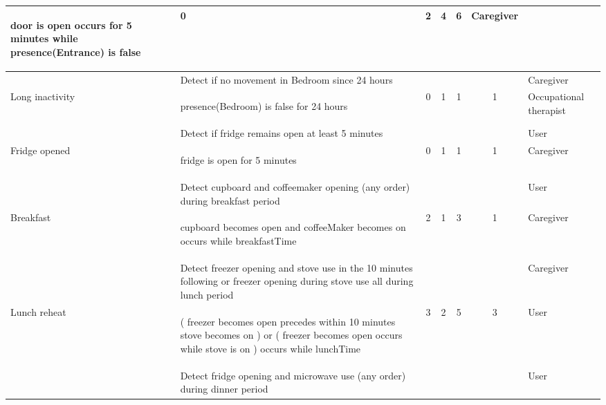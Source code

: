 \begin{table*}[!h]
\begin{tabular}{|p{1.45cm}|p{8cm}|c|c|c|c|p{1.65cm}|}
\begin{mtext}
                                    door is open occurs for 5 minutes while presence(Entrance) is false
                                  \end{mtext} & 0 & 2 & 4 & 6 &  Caregiver \\
    \hline
     &\cellcolor{gray!15} Detect if no movement in Bedroom since 24 hours & & & & & Caregiver \\ %
    Long inactivity & \begin{mtext}
      presence(Bedroom) is false for 24 hours
    \end{mtext} & 0 & 1 & 1 & 1&Occupational therapist\\                              
    \hline
    &\cellcolor{gray!15} Detect if fridge remains open at least 5 minutes & & & & & User\\%
    Fridge opened & \begin{mtext} 
      fridge is open for 5 minutes
    \end{mtext}& 0 & 1 & 1 & 1 & Caregiver \\
    \hline
     &\cellcolor{gray!15} Detect cupboard and coffeemaker opening (any order) during breakfast period &&&&& User\\%
                                 Breakfast &  \begin{mtext} 
                                    {cupboard becomes open and coffeeMaker becomes on} occurs while breakfastTime 
                                  \end{mtext} &2 &1 &3 &1& Caregiver \\
    \hline
     &\cellcolor{gray!15} Detect freezer opening and stove use in the 10 minutes following or freezer opening during stove use all during lunch period & & & & & Caregiver \\ %
     Lunch reheat& \begin{mtext}  
      { ( freezer becomes open precedes within 10 minutes stove becomes on ) or ( freezer becomes open occurs while stove is on ) } occurs while lunchTime
    \end{mtext}&3 &2 &5 &3 &User \\                              
    \hline
     & \cellcolor{gray!15} Detect fridge opening and microwave use (any order) during dinner period & & & & & User\\ %

\end{tabular}
\end{table*}
